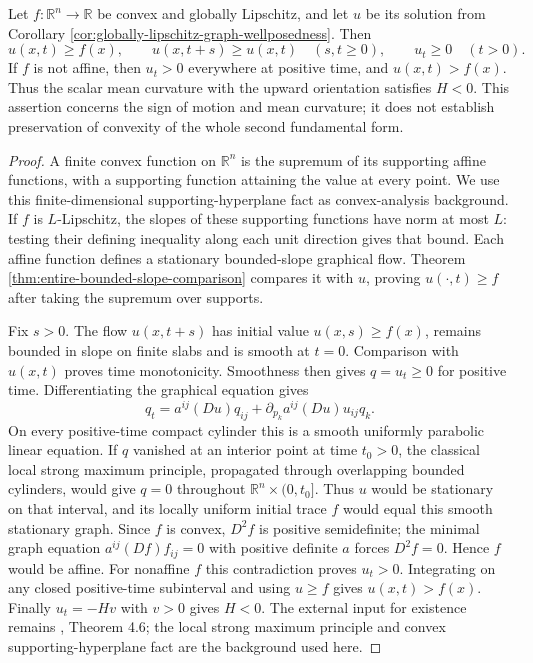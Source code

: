 \begin{proposition}\label{prop:convex-graph-data-upward-motion}
Let $f:\mathbb R^n\to\mathbb R$ be convex and globally Lipschitz, and let $u$ be its solution from Corollary \ref{cor:globally-lipschitz-graph-wellposedness}. Then
\[
 u(x,t)\geq f(x),\qquad u(x,t+s)\geq u(x,t)\quad(s,t\geq0),
 \qquad u_t\geq0\quad(t>0).
\]
If $f$ is not affine, then $u_t>0$ everywhere at positive time, and $u(x,t)>f(x)$. Thus the scalar mean curvature with the upward orientation satisfies $H<0$. This assertion concerns the sign of motion and mean curvature; it does not establish preservation of convexity of the whole second fundamental form.
\end{proposition}
\begin{proof}
A finite convex function on $\mathbb R^n$ is the supremum of its supporting affine functions, with a supporting function attaining the value at every point. We use this finite-dimensional supporting-hyperplane fact as convex-analysis background. If $f$ is $L$-Lipschitz, the slopes of these supporting functions have norm at most $L$: testing their defining inequality along each unit direction gives that bound. Each affine function defines a stationary bounded-slope graphical flow. Theorem \ref{thm:entire-bounded-slope-comparison} compares it with $u$, proving $u(\cdot,t)\geq f$ after taking the supremum over supports.

Fix $s>0$. The flow $u(x,t+s)$ has initial value $u(x,s)\geq f(x)$, remains bounded in slope on finite slabs and is smooth at $t=0$. Comparison with $u(x,t)$ proves time monotonicity. Smoothness then gives $q=u_t\geq0$ for positive time. Differentiating the graphical equation gives
\[
 q_t=a^{ij}(Du)q_{ij}
       +\partial_{p_k}a^{ij}(Du)u_{ij}q_k.
\]
On every positive-time compact cylinder this is a smooth uniformly parabolic linear equation. If $q$ vanished at an interior point at time $t_0>0$, the classical local strong maximum principle, propagated through overlapping bounded cylinders, would give $q=0$ throughout $\mathbb R^n\times(0,t_0]$. Thus $u$ would be stationary on that interval, and its locally uniform initial trace $f$ would equal this smooth stationary graph. Since $f$ is convex, $D^2f$ is positive semidefinite; the minimal graph equation $a^{ij}(Df)f_{ij}=0$ with positive definite $a$ forces $D^2f=0$. Hence $f$ would be affine. For nonaffine $f$ this contradiction proves $u_t>0$. Integrating on any closed positive-time subinterval and using $u\geq f$ gives $u(x,t)>f(x)$. Finally $u_t=-Hv$ with $v>0$ gives $H<0$. The external input for existence remains \cite{EH89}, Theorem 4.6; the local strong maximum principle and convex supporting-hyperplane fact are the background used here.
\end{proof}
